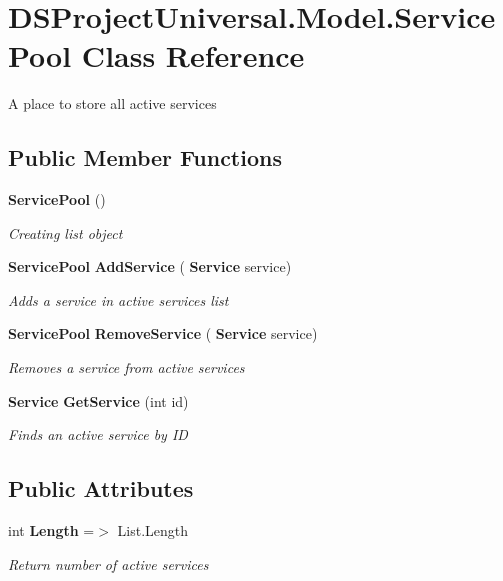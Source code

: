 \section{D\+S\+Project\+Universal.\+Model.\+Service\+Pool Class Reference}
\label{class_d_s_project_universal_1_1_model_1_1_service_pool}


A place to store all active services 


\subsection*{Public Member Functions}
\begin{DoxyCompactItemize}
\item 
\mbox{\label{class_d_s_project_universal_1_1_model_1_1_service_pool_af88bf88a9e6c1687be48b2e00cce28be}} 
\textbf{ Service\+Pool} ()
\begin{DoxyCompactList}\small\item\em Creating list object\end{DoxyCompactList}\item 
\mbox{\label{class_d_s_project_universal_1_1_model_1_1_service_pool_aed73511deb8179e675e445ccb05d866a}} 
\textbf{ Service\+Pool} \textbf{ Add\+Service} (\textbf{ Service} service)
\begin{DoxyCompactList}\small\item\em Adds a service in active services list\end{DoxyCompactList}\item 
\mbox{\label{class_d_s_project_universal_1_1_model_1_1_service_pool_a4c48b001f40bffd91887bf2bcc1dd2d4}} 
\textbf{ Service\+Pool} \textbf{ Remove\+Service} (\textbf{ Service} service)
\begin{DoxyCompactList}\small\item\em Removes a service from active services\end{DoxyCompactList}\item 
\textbf{ Service} \textbf{ Get\+Service} (int id)
\begin{DoxyCompactList}\small\item\em Finds an active service by ID\end{DoxyCompactList}\end{DoxyCompactItemize}
\subsection*{Public Attributes}
\begin{DoxyCompactItemize}
\item 
\mbox{\label{class_d_s_project_universal_1_1_model_1_1_service_pool_a796c40b943c1b5872d10d87dfca4e869}} 
int \textbf{ Length} =$>$ List.\+Length
\begin{DoxyCompactList}\small\item\em Return number of active services\end{DoxyCompactList}\end{DoxyCompactItemize}


